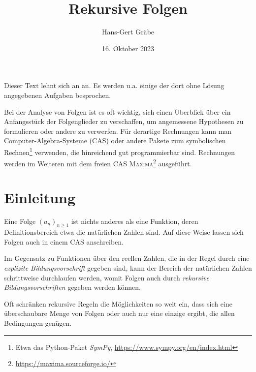 \documentclass[11pt,a4paper]{article}
\title{Rekursive Folgen}
\author{Hans-Gert Gräbe}
\date{16. Oktober 2023}
\newcommand{\cas}[1]{\textsc{#1}}
\begin{document}
\maketitle

Dieser Text lehnt sich an \cite{S} an. Es werden u.a. einige der dort ohne
Lösung angegebenen Aufgaben besprochen.

Bei der Analyse von Folgen ist es oft wichtig, sich einen Überblick über ein
Anfangsstück der Folgenglieder zu verschaffen, um angemessene Hypothesen zu
formulieren oder andere zu verwerfen.  Für derartige Rechnungen kann man
Computer-Algebra-Systeme (CAS) oder andere Pakete zum symbolischen
Rechnen\footnote{Etwa das Python-Paket \emph{SymPy},
\url{https://www.sympy.org/en/index.html} } verwenden, die hinreichend gut
programmierbar sind.  Rechnungen werden im Weiteren mit dem freien CAS
\cas{Maxima}\footnote{\url{https://maxima.sourceforge.io/}} ausgeführt.

\section*{Einleitung}

Eine Folge $(a_n)_{n\ge 1}$ ist nichts anderes als eine Funktion, deren
Definitionsbereich etwa die natürlichen Zahlen sind. Auf diese Weise lassen
sich Folgen auch in einem CAS anschreiben.

Im Gegensatz zu Funktionen über den reellen Zahlen, die in der Regel durch
eine \emph{explizite Bildungsvorschrift} gegeben sind, kann der Bereich der
natürlichen Zahlen schrittweise durchlaufen werden, womit Folgen auch durch
\emph{rekursive Bildungsvorschriften} gegeben werden können. 

Oft schränken rekursive Regeln die Möglichkeiten so weit ein, dass sich eine
überschaubare Menge von Folgen oder auch nur eine einzige ergibt, die allen
Bedingungen genügen. 
\end{document}
